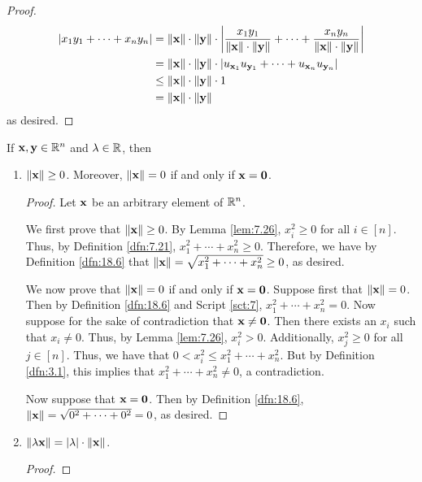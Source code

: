 \documentclass[../main.tex]{subfiles}
\begin{document}
\begin{lemma}
\begin{enumerate}[label=\textup{(}\alph*\textup{)},ref={\thelemma\alph*}]
\begin{proof}
\begin{align*}
                |x_1y_1+\cdots+x_ny_n| &= \norm{\mathbf{x}}\cdot\norm{\mathbf{y}}\cdot\left| \frac{x_1y_1}{\norm{\mathbf{x}}\cdot\norm{\mathbf{y}}}+\cdots+\frac{x_ny_n}{\norm{\mathbf{x}}\cdot\norm{\mathbf{y}}} \right|\\
                &= \norm{\mathbf{x}}\cdot\norm{\mathbf{y}}\cdot|u_{\mathbf{x}_1}u_{\mathbf{y}_1}+\cdots+u_{\mathbf{x}_n}u_{\mathbf{y}_n}|\\
                &\leq \norm{\mathbf{x}}\cdot\norm{\mathbf{y}}\cdot 1\\
                &= \norm{\mathbf{x}}\cdot\norm{\mathbf{y}}
            \end{align*}
            as desired.
        \end{proof}
    \end{enumerate}
\end{lemma}

\begin{theorem}\label{trm:18.10}
    If $\mathbf{x},\mathbf{y}\in\mathbb{R}^n$ and $\lambda\in\mathbb{R}$, then
    \begin{enumerate}[label=\textup{(}\alph*\textup{)},ref={\thetheorem\alph*}]
        \item \label{trm:18.10a}$\norm{\mathbf{x}}\geq 0$. Moreover, $\norm{\mathbf{x}}=0$ if and only if $\mathbf{x}=\bm{0}$.
        \begin{proof}
            Let $\mathbf{x}$ be an arbitrary element of $\mathbb{R}^n$.\par\smallskip
            We first prove that $\norm{\mathbf{x}}\geq 0$. By Lemma \ref{lem:7.26}, $x_i^2\geq 0$ for all $i\in[n]$. Thus, by Definition \ref{dfn:7.21}, $x_1^2+\cdots+x_n^2\geq 0$. Therefore, we have by Definition \ref{dfn:18.6} that $\norm{\mathbf{x}}=\sqrt{x_1^2+\cdots+x_n^2}\geq 0$, as desired.\par\smallskip
            We now prove that $\norm{\mathbf{x}}=0$ if and only if $\mathbf{x}=\bm{0}$. Suppose first that $\norm{\mathbf{x}}=0$. Then by Definition \ref{dfn:18.6} and Script \ref{sct:7}, $x_1^2+\cdots+x_n^2=0$. Now suppose for the sake of contradiction that $\mathbf{x}\neq\bm{0}$. Then there exists an $x_i$ such that $x_i\neq 0$. Thus, by Lemma \ref{lem:7.26}, $x_i^2>0$. Additionally, $x_j^2\geq 0$ for all $j\in[n]$. Thus, we have that $0<x_i^2\leq x_1^2+\cdots+x_n^2$. But by Definition \ref{dfn:3.1}, this implies that $x_1^2+\cdots+x_n^2\neq 0$, a contradiction.\par
            Now suppose that $\mathbf{x}=\bm{0}$. Then by Definition \ref{dfn:18.6}, $\norm{\mathbf{x}}=\sqrt{0^2+\cdots+0^2}=0$, as desired.
        \end{proof}
        \item \label{trm:18.10b}$\norm{\lambda\mathbf{x}}=|\lambda|\cdot\norm{\mathbf{x}}$.
        \begin{proof}

\end{proof}
\end{enumerate}
\end{theorem}
\end{document}
